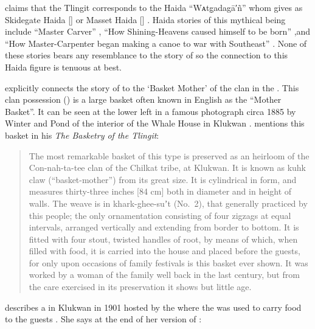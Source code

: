 \citeauthor{swanton:1908} claims that the Tlingit  corresponds to the Haida “Wᴀtg̣adagā′ñ” whom \citeauthor{enrico:2005} gives as Skidegate Haida  [] or Masset Haida  [] \parencite[1623]{enrico:2005}.
Haida stories of this mythical being include “Master Carver” \parencite[91]{garfield-forrest:1948}, “How Shining-Heavens caused himself to be born” \parencites[26–31]{swanton:1905b}[284–292]{swanton:1908a},and “How Master-Carpenter began making a canoe to war with Southeast” \parencite[32–35]{swanton:1905b}.
None of these stories bears any resemblance to the story of  so the connection to this Haida figure is tenuous at best.

\citeauthor{paul:1944} explicitly connects the story of  to the  ‘Basket Mother’ of the  clan in the  \parencite[69]{paul:1944}.
This clan possession () is a large basket often known in English as the “Mother Basket”.
It can be seen at the lower left in a famous photograph circa 1885 by Winter and Pond of the interior of the  Whale House in Klukwan \parencite[63]{emmons:1991}.
\citeauthor{emmons:1903} mentions this basket in his \textit{The Basketry of the Tlingit}:

\begin{quote}\small
The most remarkable basket of this type is preserved as an heirloom of the Con-nah-ta-tee clan of the Chilkat tribe, at Klukwan.
It is known as kuhk claw (“basket-mother”) from its great size.
It is cylindrical in form, and measures thirty-three inches [84 cm] both in diameter and in height of walls.
The weave is in khark-ghee-suʼt (No.\ 2), that generally practiced by this people; the only ornamentation consisting of four zigzags at equal intervals, arranged vertically and extending from border to bottom.
It is fitted with four stout, twisted handles of root, by means of which, when filled with food, it is carried into the house and placed before the guests, for only upon occasions of family festivals is this basket ever shown.
It was worked by a woman of the family well back in the last century, but from the care exercised in its preservation it shows but little age.
\end{quote}

\citeauthor{paul:1944} describes a  in Klukwan in 1901 hosted by the  where the  was used to carry food to the  guests \parencite[69]{paul:1944}.
She says at the end of her version of :

